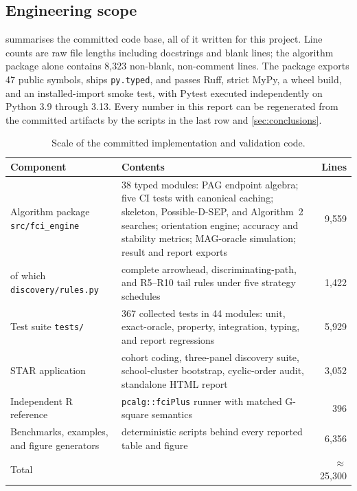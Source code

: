 \documentclass[11pt,a4paper]{article}
\newcommand{\code}[1]{\texttt{#1}}
\begin{document}
\subsection{Engineering scope}

 summarises the committed code base, all of it written for
this project. Line counts are raw file lengths including docstrings and blank
lines; the algorithm package alone contains 8,323 non-blank, non-comment
lines. The package exports 47 public symbols, ships \code{py.typed}, and
passes Ruff, strict MyPy, a wheel build, and an installed-import smoke test,
with Pytest executed independently on Python 3.9 through 3.13. Every number in
this report can be regenerated from the committed artifacts by the scripts in
the last row and \cref{sec:conclusions}.

\begin{table}[H]
\caption{Scale of the committed implementation and validation code.}
\label{tab:scale}
\small
\begin{tabularx}{\textwidth}{p{}Yr}
\toprule
Component & Contents & Lines \\
\midrule
Algorithm package \code{src/fci\_engine} &
38 typed modules: PAG endpoint algebra; five CI tests with canonical caching;
skeleton, Possible-D-SEP, and Algorithm~2 searches; orientation engine;
accuracy and stability metrics; MAG-oracle simulation; result and report
exports & 9,559 \\
\hspace{1em}of which \code{discovery/rules.py} &
complete arrowhead, discriminating-path, and R5--R10 tail rules under five
strategy schedules & 1,422 \\
Test suite \code{tests/} &
367 collected tests in 44 modules: unit, exact-oracle, property, integration,
typing, and report regressions & 5,929 \\
STAR application &
cohort coding, three-panel discovery suite, school-cluster bootstrap,
cyclic-order audit, standalone HTML report & 3,052 \\
Independent R reference &
\code{pcalg::fciPlus} runner with matched G-square semantics & 396 \\
Benchmarks, examples, and figure generators &
deterministic scripts behind every reported table and figure & 6,356 \\
\midrule
Total & & \(\approx\)25,300 \\
\bottomrule
\end{tabularx}
\end{table}
\end{document}
